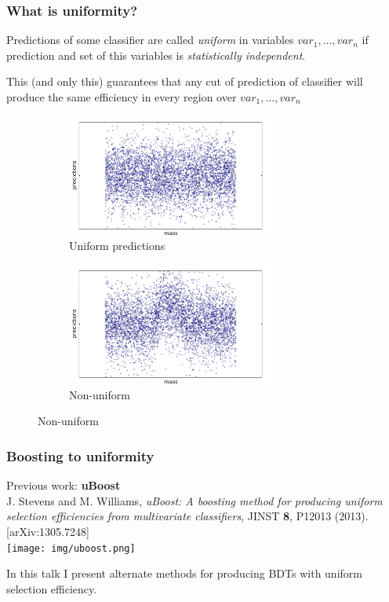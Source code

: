 \documentclass{beamer}
\begin{document}
\begin{frame}
    \frametitle{What is uniformity?}

    Predictions of some classifier are called \textit{uniform} in variables $var_1, \dots, var_n$ if prediction and set of this variables is \textit{statistically independent}. 

    This (and only this) guarantees that any cut of prediction of classifier will produce the same efficiency in every region over $var_1, \dots, var_n$

    \pause

    \begin{figure}
        \centering
        \begin{subfigure}[b]{0.48\textwidth}
            \includegraphics[width=\textwidth, height=4cm]{img/uniform.pdf}
            \caption{Uniform predictions}
        \end{subfigure}
        \begin{subfigure}[b]{0.48\textwidth}
            \includegraphics[width=\textwidth, height=4cm]{img/nonuniform.pdf}
            \caption{Non-uniform}
        \end{subfigure}
    \end{figure}

\end{frame}

\begin{frame}
    \frametitle{Boosting to uniformity}
    Previous work: \textbf{uBoost} \\
    {\small J. Stevens and M. Williams,
        {\em uBoost: A boosting method for producing uniform selection efficiencies from multivariate classifiers}, 
        JINST {\bf 8}, P12013 (2013). [arXiv:1305.7248]
    }
    \bigskip \\

    \center
    \texttt{[image: img/uboost.png]}

    In this talk I present alternate methods for producing BDTs with uniform selection efficiency.
\end{frame}
\end{document}
